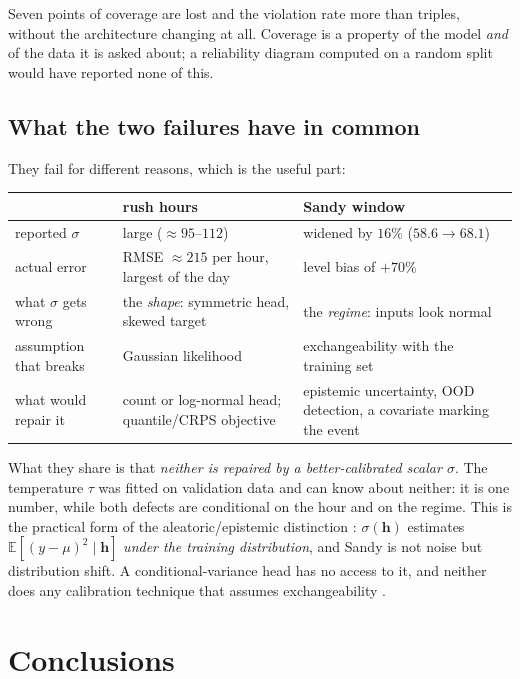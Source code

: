 \documentclass[11pt,a4paper]{article}
\newcommand{\hvec}{\mathbf{h}}
\newcommand{\given}{\mid}
\begin{document}
Seven points of coverage are lost and the violation rate more than triples, without the architecture
changing at all. Coverage is a property of the model \emph{and} of the data it is asked about; a
reliability diagram computed on a random split would have reported none of this.

\subsection{What the two failures have in common}

They fail for different reasons, which is the useful part:

\begin{center}
\small
\begin{tabular}{p{3.1cm}p{5.2cm}p{5.2cm}}
\toprule
 & \textbf{rush hours} & \textbf{Sandy window} \\
\midrule
reported $\sigma$ & large ($\approx95$--$112$) & widened by $16\%$ ($58.6\to68.1$) \\
actual error & RMSE $\approx215$ per hour, largest of the day & level bias of $+70\%$ \\
what $\sigma$ gets wrong & the \emph{shape}: symmetric head, skewed target & the \emph{regime}: inputs look normal \\
assumption that breaks & Gaussian likelihood & exchangeability with the training set \\
what would repair it & count or log-normal head; quantile/CRPS objective & epistemic uncertainty, OOD detection, a covariate marking the event \\
\bottomrule
\end{tabular}
\end{center}

What they share is that \emph{neither is repaired by a better-calibrated scalar $\sigma$}. The
temperature $\tau$ was fitted on validation data and can know about neither: it is one number, while
both defects are conditional on the hour and on the regime. This is the practical form of the
aleatoric/epistemic distinction \cite{kendall2017}: $\sigma(\hvec)$ estimates
$\mathbb{E}[(y-\mu)^2\given\hvec]$ \emph{under the training distribution}, and Sandy is not noise but
distribution shift. A conditional-variance head has no access to it, and neither does any calibration
technique that assumes exchangeability \cite{guo2017}.

\section{Conclusions}
\end{document}
